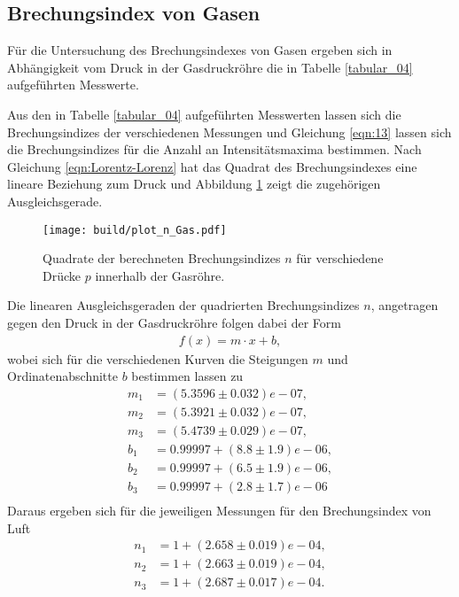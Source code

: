\subsection{Brechungsindex von Gasen}
\noindent Für die Untersuchung des Brechungsindexes von Gasen ergeben sich in
Abhängigkeit vom Druck in der Gasdruckröhre die in Tabelle \ref{tabular_04}
aufgeführten Messwerte. \\
\FloatBarrier

\FloatBarrier
\noindent Aus den in Tabelle \ref{tabular_04} aufgeführten Messwerten lassen sich
die Brechungsindizes der verschiedenen Messungen und Gleichung \ref{eqn:13}
lassen sich die Brechungsindizes für die Anzahl an Intensitätsmaxima bestimmen.
Nach Gleichung \ref{eqn:Lorentz-Lorenz} hat das Quadrat des Brechungsindexes eine lineare Beziehung zum Druck
und Abbildung \ref{fig:03} zeigt die zugehörigen Ausgleichsgerade. \\
\FloatBarrier
\begin{figure}
  \centering
  \texttt{[image: build/plot\_n\_Gas.pdf]}
  \caption{Quadrate der berechneten Brechungsindizes $n$ für verschiedene Drücke
  $p$ innerhalb der Gasröhre.}
  \label{fig:03}
\end{figure}
\FloatBarrier
\noindent Die linearen Ausgleichsgeraden der quadrierten Brechungsindizes $n$,
angetragen gegen den Druck in der Gasdruckröhre folgen dabei der Form
\begin{align}
  f(x) = m \cdot x + b,
\end{align}
wobei sich für die verschiedenen Kurven die Steigungen $m$ und Ordinatenabschnitte
$b$ bestimmen lassen zu
\begin{align*}
  m_1 &= (5.3596 \pm 0.032)e-07, \\
  m_2 &= (5.3921 \pm 0.032)e-07, \\
  m_3 &= (5.4739 \pm 0.029)e-07, \\
  b_1 &= 0.99997 + (8.8 \pm 1.9)e-06, \\
  b_2 &= 0.99997 + (6.5 \pm 1.9)e-06, \\
  b_3 &= 0.99997 + (2.8 \pm 1.7)e-06 \\
\end{align*}
%
%
%
%
\noindent Daraus ergeben sich für die jeweiligen Messungen für den Brechungsindex
von Luft
\begin{align}
  n_1 &= 1 + (2.658 \pm 0.019)e-04, \\
  n_2 &= 1 + (2.663 \pm 0.019)e-04, \\
  n_3 &= 1 + (2.687 \pm 0.017)e-04. \\
\end{align}
